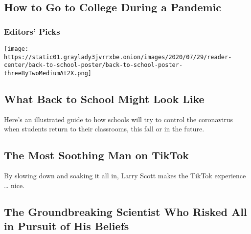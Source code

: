 \hypertarget{how-to-go-to-college-during-a-pandemic}{%
\subsection{How to Go to College During a
Pandemic}\label{how-to-go-to-college-during-a-pandemic}}

\hypertarget{editors-picks}{%
\subsubsection{Editors' Picks}\label{editors-picks}}

\href{/interactive/2020/07/29/us/schools-reopening-coronavirus.html}{}

\texttt{[image: https://static01.graylady3jvrrxbe.onion/images/2020/07/29/reader-center/back-to-school-poster/back-to-school-poster-threeByTwoMediumAt2X.png]}

\href{/interactive/2020/07/29/us/schools-reopening-coronavirus.html}{}

\hypertarget{what-back-to-school-might-look-like}{%
\subsection{What Back to School Might Look
Like}\label{what-back-to-school-might-look-like}}

Here's an illustrated guide to how schools will try to control the
coronavirus when students return to their classrooms, this fall or in
the future.

\href{/2020/07/31/arts/larry-scott-tiktok-larryakumpo.html}{}

\hypertarget{the-most-soothing-man-on-tiktok}{%
\subsection{The Most Soothing Man on
TikTok}\label{the-most-soothing-man-on-tiktok}}

By slowing down and soaking it all in, Larry Scott makes the TikTok
experience \ldots{} nice.

\href{/2020/07/31/arts/larry-scott-tiktok-larryakumpo.html}{}

\href{/2020/07/28/books/review/a-dominant-character-haldane-samanth-subramanian.html}{}

\hypertarget{the-groundbreaking-scientist-who-risked-all-in-pursuit-of-his-beliefs}{%
\subsection{The Groundbreaking Scientist Who Risked All in Pursuit of
His
Beliefs}\label{the-groundbreaking-scientist-who-risked-all-in-pursuit-of-his-beliefs}}

